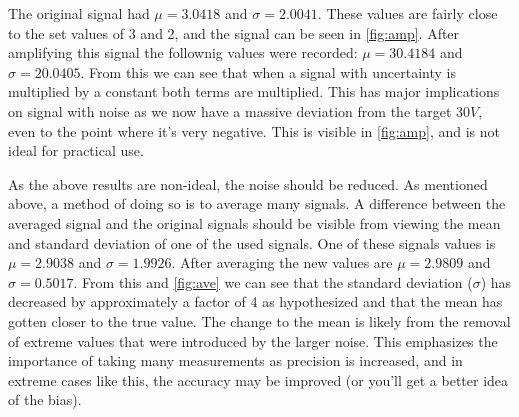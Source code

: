 \documentclass[a4paper, 12pt]{article}
\begin{document}
            The original signal had $\mu = 3.0418$ and $\sigma = 2.0041$. These values are fairly close to the set values of 3 and 2, and the signal can be seen in \cref{fig:amp}. After amplifying this signal the follownig values were recorded: $\mu = 30.4184$ and $\sigma = 20.0405$. From this we can see that when a signal with uncertainty is multiplied by a constant both terms are multiplied. This has major implications on signal with noise as we now have a massive deviation from the target $30V$, even to the point where it's very negative. This is visible in \cref{fig:amp}, and is not ideal for practical use.
            \par
            As the above results are non-ideal, the noise should be reduced. As mentioned above, a method of doing so is to average many signals. A difference between the averaged signal and the original signals should be visible from viewing the mean and standard deviation of one of the used signals. One of these signals values is $\mu = 2.9038$ and $\sigma = 1.9926$. After averaging the new values are $\mu = 2.9809$ and $\sigma = 0.5017$. From this and \cref{fig:ave} we can see that the standard deviation ($\sigma$) has decreased by approximately a factor of 4 as hypothesized and that the mean has gotten closer to the true value. The change to the mean is likely from the removal of extreme values that were introduced by the larger noise. This emphasizes the importance of taking many measurements as precision is increased, and in extreme cases like this, the accuracy may be improved (or you'll get a better idea of the bias).
\end{document}
